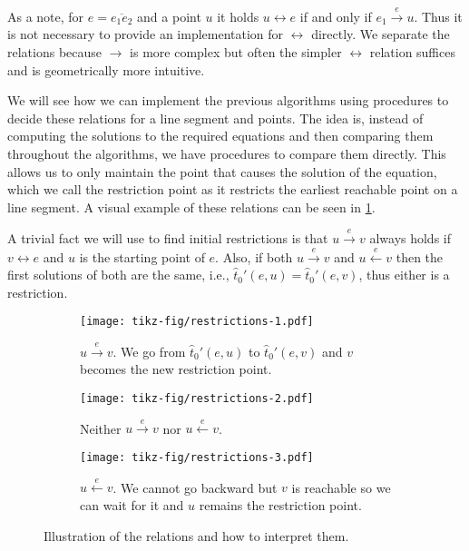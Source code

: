 As a note, for \(e = \overline{e_1e_2}\) and a point \(u\) it holds \(u \leftrightarrow e\) if and only if \(e_1 \overset{e}\rightarrow u\). Thus it is not necessary to provide an implementation for \(\leftrightarrow\) directly. We separate the relations because \(\rightarrow\) is more complex but often the simpler \(\leftrightarrow\) relation suffices and is geometrically more intuitive.

We will see how we can implement the previous algorithms using procedures to decide these relations for a line segment and points. The idea is, instead of computing the solutions to the required equations and then comparing them throughout the algorithms, we have procedures to compare them directly. This allows us to only maintain the point that causes the solution of the equation, which we call the restriction point as it restricts the earliest reachable point on a line segment. A visual example of these relations can be seen in \cref{fig:restrictions}.

A trivial fact we will use to find initial restrictions is that \(u \overset e\rightarrow v\) always holds if \(v \leftrightarrow e\) and \(u\) is the starting point of \(e\). Also, if both \(u \overset e\rightarrow v\) and \(u \overset e\leftarrow v\) then the first solutions of both are the same, i.e., \(\hat t_0'(e, u) = \hat t_0'(e,v)\), thus either is a restriction. 

\begin{figure}[ht]
  \centering
  \begin{subfigure}[t]{0.3\textwidth}
    \texttt{[image: tikz-fig/restrictions-1.pdf]}
    \caption{\(u \overset e\rightarrow v\). We go from \(\hat t_0'(e, u)\) to \(\hat t_0'(e, v)\) and \(v\) becomes the new restriction point.}
  \end{subfigure}
  \begin{subfigure}[t]{0.3\textwidth}
    \texttt{[image: tikz-fig/restrictions-2.pdf]}
    \caption{Neither \(u \overset e\rightarrow v\) nor \(u \overset e\leftarrow v\).}
  \end{subfigure}
  \begin{subfigure}[t]{0.3\textwidth}
    \texttt{[image: tikz-fig/restrictions-3.pdf]}
    \caption{\(u \overset e\leftarrow v\). We cannot go backward but \(v\) is reachable so we can wait for it and \(u\) remains the restriction point. }
  \end{subfigure}
  \caption{Illustration of the relations and how to interpret them. }
  \label{fig:restrictions}
\end{figure}

